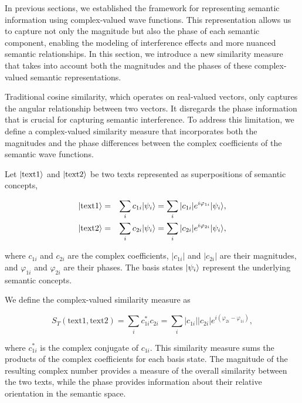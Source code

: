 \documentclass[prd,amsmath,amssymb,12pt]{revtex4}
\DeclarePairedDelimiter\ket{\lvert}{\rangle}
\begin{document}
In previous sections, we established the framework for representing semantic information using complex-valued wave
functions. This representation allows us to capture not only the magnitude but also the phase of each semantic component,
enabling the modeling of interference effects and more nuanced semantic relationships. In this section, we
introduce a new similarity measure that takes into account both the magnitudes and the phases of these
complex-valued semantic representations.

Traditional cosine similarity, which operates on real-valued vectors, only captures the angular relationship
between two vectors. It disregards the phase information that is crucial for capturing semantic interference.
To address this limitation, we define a complex-valued similarity measure that incorporates both the magnitudes
and the phase differences between the complex coefficients of the semantic wave functions.

Let $\ket{\text{text1}}$ and $\ket{\text{text2}}$ be two texts represented as superpositions of semantic concepts,

\begin{eqnarray}
    \ket{\text{text1}} &=& \sum_{i} c_{1i} \ket{\psi_i} = \sum_{i} |c_{1i}| e^{i\varphi_{1i}} \ket{\psi_i}, \\
    \ket{\text{text2}} &=& \sum_{i} c_{2i} \ket{\psi_i} = \sum_{i} |c_{2i}| e^{i\varphi_{2i}} \ket{\psi_i},
\end{eqnarray}

\noindent
where $c_{1i}$ and $c_{2i}$ are the complex coefficients, $|c_{1i}|$ and $|c_{2i}|$ are their magnitudes,
and $\varphi_{1i}$ and $\varphi_{2i}$ are their phases. The basis states $\ket{\psi_i}$ represent the
underlying semantic concepts.

We define the complex-valued similarity measure as

\begin{equation}
  S_T (\text{text1},\text{text2}) =  \sum_{i} c_{1i}^* c_{2i}
  = \sum_{i} |c_{1i}| |c_{2i}| e^{i(\varphi_{2i}-\varphi_{1i})},
\end{equation}

\noindent
where $c_{1i}^*$ is the complex conjugate of $c_{1i}$. This similarity measure sums the products of the
complex coefficients for each basis state. The magnitude of the resulting complex number provides a
measure of the overall similarity between the two texts, while the phase provides information about
their relative orientation in the semantic space.
\end{document}

